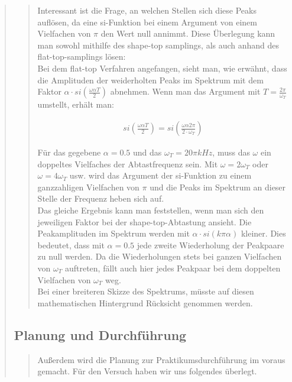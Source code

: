 \begin{quote}
\begin{quote}
        Interessant ist die Frage, an welchen Stellen sich diese Peaks auflösen,
        da eine si-Funktion bei einem Argument von einem Vielfachen von $\pi$
        den Wert null annimmt. Diese Überlegung kann man sowohl mithilfe des
        shape-top samplings, als auch anhand des flat-top-samplings lösen:\\
        
        Bei dem flat-top Verfahren angefangen, sieht man, wie erwähnt, dass die
        Amplituden der weiderholten Peaks im Spektrum mit dem Faktor 
        $\alpha \cdot si(\frac{\omega \alpha T}{2})$ abnehmen. Wenn man das
        Argument mit $T = \frac{2\pi}{\omega_T}$ umstellt, erhält man:
        
        \begin{equation*}
        	\begin{split}
        		si(\frac{\omega \alpha T}{2}) = si(\frac{\omega \alpha
        		2\pi}{2 \cdot \omega_T})
        	\end{split}
        \end{equation*}
        
        Für das gegebene $\alpha = 0.5$ und das $\omega_T = 20 \pi kHz$, muss
        das $\omega$ ein doppeltes Vielfaches der Abtastfrequenz sein. Mit
        $\omega = 2\omega_T$ oder $\omega = 4\omega_T$ usw. wird das Argument
        der si-Funktion zu einem ganzzahligen Vielfachen von $\pi$ und die Peaks
        im Spektrum an dieser Stelle der Frequenz heben sich auf.\\
        
        Das gleiche Ergebnis kann man feststellen, wenn man sich den jeweiligen
        Faktor bei der shape-top-Abtastung ansieht. Die Peakamplituden im
        Spektrum werden mit $\alpha \cdot si(k \pi \alpha)$ kleiner. Dies
        bedeutet, dass mit $\alpha = 0.5$ jede zweite Wiederholung der Peakpaare
        zu null werden. Da die Wiederholungen stets bei ganzen Vielfachen von
        $\omega_T$ auftreten, fällt auch hier jedes Peakpaar bei dem doppelten
        Vielfachen von $\omega_T$ weg.\\
        Bei einer breiteren Skizze des Spektrums, müsste auf diesen
        mathematischen Hintergrund Rücksicht genommen werden.
        
        
    \end{quote}  %
    
    \subsection{Planung und Durchführung}
    \begin{quote}
        Außerdem wird die Planung zur Praktikumsdurchführung im voraus gemacht. Für
        den Versuch haben wir uns folgendes überlegt.\\
        

\end{quote}
\end{quote}
